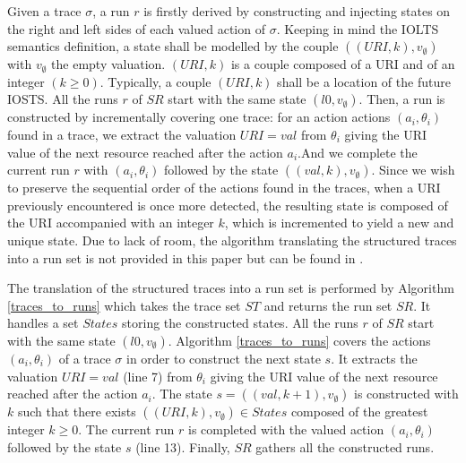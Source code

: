 Given a trace $\sigma$, a run $r$ is firstly derived  by
constructing and injecting states on the right and left sides of
each valued action of $\sigma$. Keeping in mind the IOLTS
semantics definition, a state shall be modelled by the couple
$((URI,k),v_\emptyset)$ with $v_\emptyset$ the empty valuation.
$(URI,k)$ is a couple composed of a URI and of an integer $(k
\geq 0)$. Typically, a couple $(URI,k)$ shall be a location of
the future IOSTS. All the runs $r$ of $SR$ start with the same
state $(l0,v_\emptyset)$. Then, a run is constructed by
incrementally covering one trace: for an action actions
$(a_i,\theta_i)$ found in a trace, we extract the valuation
$URI=val$ from $\theta_i$ giving the URI value of the next
resource reached after the action $a_i$.And we complete the
current run $r$ with $(a_i,\theta_i)$ followed by the state
$((val,k),v_\emptyset)$. Since we wish to preserve the sequential
order of the actions found in the traces, when a URI previously
encountered is once more detected, the resulting state is
composed of the URI accompanied with an integer $k$, which is
incremented to yield a new and unique state. Due to lack of room,
the algorithm translating the structured traces into a run set is
not provided in this paper but can be found in \cite{RR14}.

The translation of the structured traces into a run set is
performed by Algorithm \ref{traces_to_runs} which takes the trace
set $ST$ and returns the run set $SR$. It handles a set $States$
storing the constructed states. All the runs $r$ of $SR$ start
with the same state $(l0,v_\emptyset)$. Algorithm
\ref{traces_to_runs} covers the actions $(a_i,\theta_i)$ of a
trace $\sigma$ in order to construct the next state $s$. It
extracts the valuation $URI=val$ (line 7) from $\theta_i$ giving
the URI value of the next resource reached after the action
$a_i$. The state $s=((val,k+1),v_\emptyset)$ is constructed with
$k$ such that there exists $((URI,k),v_\emptyset) \in States$
composed of the greatest integer $k \geq 0$. The current run $r$
is completed with the valued action $(a_i,\theta_i)$ followed by
the state $s$ (line 13). Finally, $SR$ gathers all the
constructed runs.

